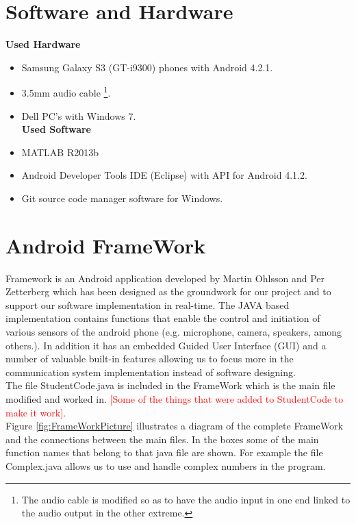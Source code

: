 \documentclass[12pt,a4paper,openright]{report}
\begin{document}
\section{Software and Hardware}


\textbf{Used Hardware}
\begin{itemize}
\item Samsung Galaxy S3 (GT-i9300) phones with Android 4.2.1.
\item 3.5mm audio cable {\color{Black}\footnote{The audio cable is modified so as to have the audio input in one end linked to the audio output in the other extreme.}}.
\item Dell PC's with Windows 7.
\\

\textbf{Used Software}
\item MATLAB R2013b 
\item Android Developer Tools IDE (Eclipse) with  API for Android 4.1.2. 
\item Git source code manager software for Windows.

\end{itemize}


\section{Android FrameWork}

Framework is an Android application developed by Martin Ohlsson and Per Zetterberg which has been designed as the groundwork for our project and to support our software implementation in real-time. The JAVA based implementation contains functions that enable the control and initiation of various sensors of the android phone (e.g. microphone, camera, speakers, among others.). In addition it has an embedded  Guided User Interface (GUI) and a number of valuable built-in features allowing us to focus more in the communication system implementation instead of software designing. \\
The file StudentCode.java is included in the FrameWork which is the main file modified and worked in. \textcolor{red}{[Some of the things that were added to StudentCode to make it work]}.\\

Figure \ref{fig:FrameWorkPicture} illustrates a diagram of the complete FrameWork and the connections between the main files. In the boxes some of the main function names that belong to that java file are shown. For example the file Complex.java \cite{ComplexJavaRef} allows us to use and handle complex numbers in the program. 
\end{document}
